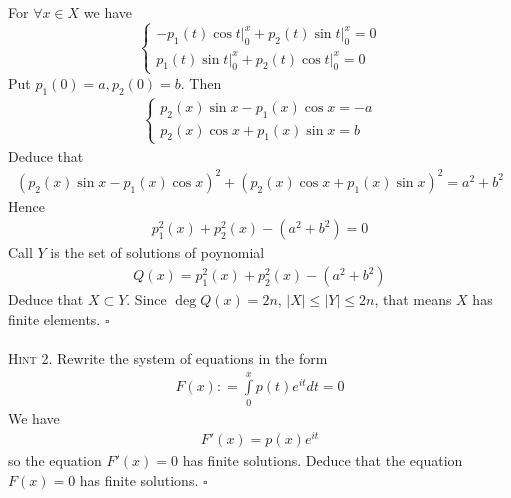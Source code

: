 \documentclass{article}
\numberwithin{equation}{section}
\begin{document}
For $\forall x \in X$ we have
\begin{equation}
\left\{ {\begin{array}{*{20}{c}}
{ - {p_1}\left( t \right)\left. {\cos t} \right|_0^x + {p_2}\left( t \right)\left. {\sin t} \right|_0^x = 0}\\
{{p_1}\left( t \right)\left. {\sin t} \right|_0^x + {p_2}\left( t \right)\left. {\cos t} \right|_0^x = 0}
\end{array}} \right.
\end{equation}
Put ${p_1}\left( 0 \right) = a,{p_2}\left( 0 \right) = b$. Then 
\begin{align}
\left\{ {\begin{array}{*{20}{c}}
{{p_2}\left( x \right)\sin x - {p_1}\left( x \right)\cos x =  - a}\\
{{p_2}\left( x \right)\cos x + {p_1}\left( x \right)\sin x = b}
\end{array}} \right.
\end{align}
Deduce that
\begin{align}
{\left( {{p_2}\left( x \right)\sin x - {p_1}\left( x \right)\cos x} \right)^2} + {\left( {{p_2}\left( x \right)\cos x + {p_1}\left( x \right)\sin x} \right)^2} = {a^2} + {b^2}
\end{align}
Hence
\begin{align}
p_1^2\left( x \right) + p_2^2\left( x \right) - \left( {{a^2} + {b^2}} \right) = 0
\end{align}
Call $Y$ is the set of solutions of poynomial
\begin{align}
Q\left( x \right) = p_1^2\left( x \right) + p_2^2\left( x \right) - \left( {{a^2} + {b^2}} \right)
\end{align}
Deduce that $X \subset Y$. Since $\deg Q\left( x \right) = 2n$, $\left| X \right| \le \left| Y \right| \le 2n$, that means $X$ has finite elements. \hfill $\square$\\
\\
\textsc{Hint 2.} Rewrite the system of equations in the form
\begin{align}
F\left( x \right): = \int\limits_0^x {p\left( t \right){e^{it}}dt}  = 0
\end{align}
We have
\begin{align}
F'\left( x \right) = p\left( x \right){e^{it}}
\end{align}
so the equation $F'\left( x \right) = 0$ has finite solutions. Deduce that the equation $F\left( x \right) = 0$ has finite solutions. \hfill $\square$\\
\\
\end{document}

